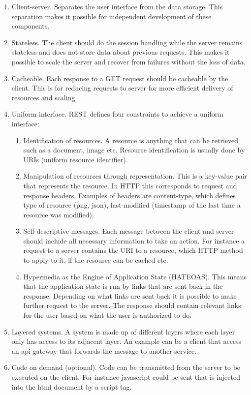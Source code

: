\documentclass[a4paper,12pt]{article}
\begin{document}
\begin{enumerate}
\item Client-server. Separates the user interface from the data storage. This separation makes it possible for independent development of these components. 
\item Stateless. The client should do the session handling while the server remains stateless and does not store data about previous requests. This makes it possible to scale the server and recover from failures without the loss of data.
\item Cacheable. Each response to a GET request should be cacheable by the client. This is for reducing requests to server for more efficient delivery of resources and scaling. 
\item Uniform interface. REST defines four constraints to achieve a uniform interface: 
\begin{enumerate}
\item Identification of resources. A resource is anything that can be retrieved such as a document, image etc. Resource identification is usually done by URIs (uniform resource identifier).
\item Manipulation of resources through representation. This is a key-value pair that represents the resource. In HTTP this corresponds to request and response headers. Examples of headers are content-type, which defines type of resource (png, json), last-modified (timestamp of the last time a resource was modified).
\item Self-descriptive messages. Each message between the client and server should include all necessary information to take an  action. For instance a request to a server contains the URI to a resource, which HTTP method to apply to it, if the resource can be cached etc. 
\item Hypermedia as the Engine of Application State (HATEOAS). This means that the application state is run by links that are sent back in the response. Depending on what links are sent back it is possible to make further request to the server. The response should contain relevant links for the user based on what the user is authorized to do. 
\end{enumerate}
\item Layered systems. A system is made up of different layers where each layer only has access to its adjacent layer. An example can be a client that access an api gateway that forwards the message to another service.
\item Code on demand (optional). Code can be transmitted from the server to be executed on the client. For instance javascript could be sent that is injected into the html document by a script tag.
\end{enumerate}
\end{document}
